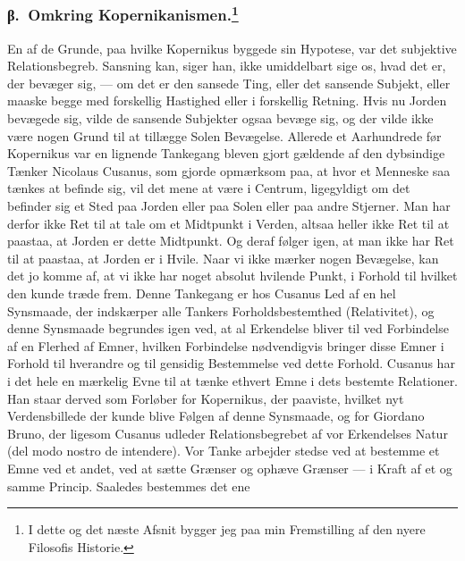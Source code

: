 \documentclass[12pt]{article}
\newcommand{\opage}[1]{\marginnote{\footnotesize\textit{[#1]}}}
\begin{document}
\subsubsection*{β.~Omkring Kopernikanismen.\footnote{I dette og det næste
Afsnit bygger jeg paa min Fremstilling af den nyere Filosofis Historie.}}%
%
\label{sec:3d-beta}%
\noindent En af de Grunde, paa hvilke Kopernikus byggede sin Hypotese, var
det subjektive Relationsbegreb. Sansning kan, siger han, ikke
\opage{63} umiddelbart sige os, hvad det er, der bevæger sig, --- om det er den sansede
Ting, eller det sansende Subjekt, eller maaske begge med forskellig Hastighed
eller i forskellig Retning. Hvis nu Jorden bevægede sig, vilde de sansende
Subjekter ogsaa bevæge sig, og der vilde ikke være nogen Grund til at tillægge
Solen Bevægelse. Allerede et Aarhundrede før Kopernikus var en lignende
Tankegang bleven gjort gældende af den dybsindige Tænker Nicolaus Cusanus,
som gjorde opmærksom paa, at hvor et Menneske saa tænkes at befinde sig, vil
det mene at være i Centrum, ligegyldigt om det befinder sig et Sted paa Jorden
eller paa Solen eller paa andre Stjerner. Man har derfor ikke Ret til at tale
om et Midtpunkt i Verden, altsaa heller ikke Ret til at paastaa, at Jorden er
dette Midtpunkt. Og deraf følger igen, at man ikke har Ret til at paastaa, at
Jorden er i Hvile. Naar vi ikke mærker nogen Bevægelse, kan det jo komme af,
at vi ikke har noget absolut hvilende Punkt, i Forhold til hvilket den kunde
træde frem. Denne Tankegang er hos Cusanus Led af en hel Synsmaade, der
indskærper alle Tankers Forholdsbestemthed (Relativitet), og denne Synsmaade
begrundes igen ved, at al Erkendelse bliver til ved Forbindelse af en Flerhed
af Emner, hvilken Forbindelse nødvendigvis bringer disse Emner i Forhold til
hverandre og til gensidig Bestemmelse ved dette Forhold. Cusanus har i det
hele en mærkelig Evne til at tænke ethvert Emne i dets bestemte Relationer.
Han staar derved som Forløber for Kopernikus, der paaviste, hvilket nyt
Verdensbillede der kunde blive Følgen af denne Synsmaade, og for Giordano
Bruno, der ligesom Cusanus udleder Relationsbegrebet af vor Erkendelses Natur
(del modo nostro de intendere). Vor Tanke arbejder stedse ved at bestemme et
Emne ved et andet, ved at sætte Grænser og
\opage{64} \setcounter{footnote}{0}
ophæve Grænser --- i Kraft af et og samme Princip. Saaledes bestemmes det ene
\end{document}
